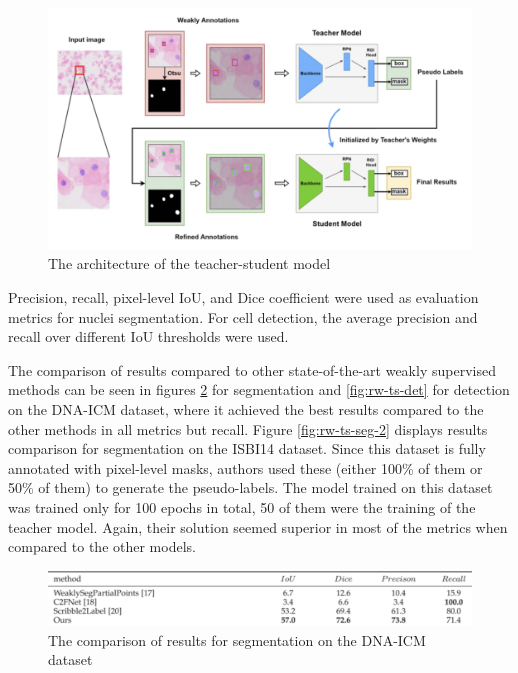 \begin{figure}[H]
    \begin{centering}
    \includegraphics[width=14cm]{assets/images/rw-teacher-student.png}
    \par\end{centering}
    \caption{The architecture of the teacher-student model}
    \label{fig:rw-teacher-student}
\end{figure}

Precision, recall, pixel-level IoU, and Dice coefficient were used as evaluation metrics for nuclei segmentation. For cell detection, the average precision and recall over different IoU thresholds were used.

The comparison of results compared to other state-of-the-art weakly supervised methods can be seen in figures \ref{fig:rw-ts-seg} for segmentation and \ref{fig:rw-ts-det} for detection on the DNA-ICM dataset, where it achieved the best results compared to the other methods in all metrics but recall. Figure \ref{fig:rw-ts-seg-2} displays results comparison for segmentation on the ISBI14 dataset. Since this dataset is fully annotated with pixel-level masks, authors used these (either 100\% of them or 50\% of them) to generate the pseudo-labels. The model trained on this dataset was trained only for 100 epochs in total, 50 of them were the training of the teacher model. Again, their solution seemed superior in most of the metrics when compared to the other models.

\begin{figure}[H]
    \begin{centering}
    \includegraphics[width=14cm]{assets/images/rw-ts-seg.png}
    \par\end{centering}
    \caption{The comparison of results for segmentation on the DNA-ICM dataset}
    \label{fig:rw-ts-seg}
\end{figure}

